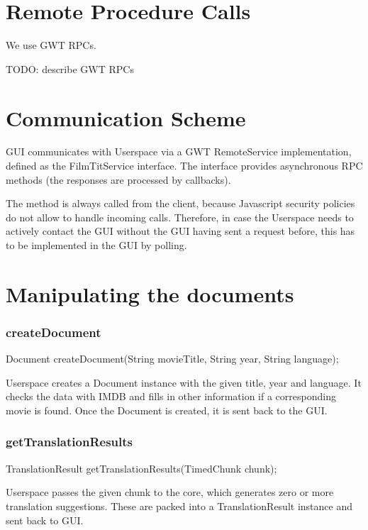 \label{chap:communication}
\label{sec:communication}

\section{Remote Procedure Calls}

We use GWT RPCs.

TODO: describe GWT RPCs

\section{Communication Scheme}
GUI communicates with Userspace via a GWT RemoteService implementation, defined as the FilmTitService interface.
The interface provides asynchronous RPC methods (the responses are processed by callbacks).

The method is always called from the client, because Javascript security policies do not allow to handle incoming calls.
Therefore, in case the Userspace needs to actively contact the GUI without the GUI having sent a request before,
this has to be implemented in the GUI by polling.

\section{Manipulating the documents}

\subsubsection{createDocument}
	Document createDocument(String movieTitle, String year, String language);

Userspace creates a Document instance with the given title, year and language.
It checks the data with IMDB and fills in other information if a corresponding movie is found.
Once the Document is created, it is sent back to the GUI.

\subsubsection{getTranslationResults}
	TranslationResult getTranslationResults(TimedChunk chunk);
	
Userspace passes the given chunk to the core, which generates zero or more translation suggestions.
These are packed into a TranslationResult instance and sent back to GUI.

